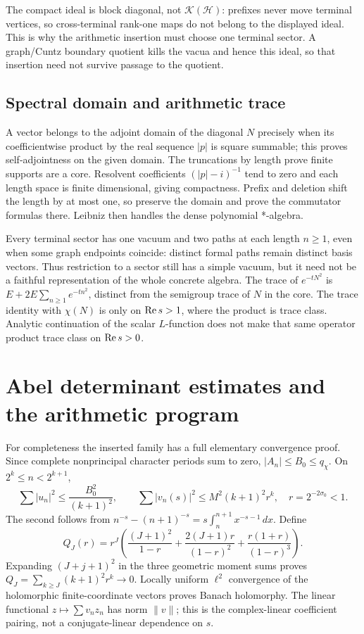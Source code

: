 The compact ideal is block diagonal, not $\mathcal K(\mathcal H)$: prefixes never move terminal vertices, so cross-terminal rank-one maps do not belong to the displayed ideal. This is why the arithmetic insertion must choose one terminal sector. A graph/Cuntz boundary quotient kills the vacua and hence this ideal, so that insertion need not survive passage to the quotient.

\section{Spectral domain and arithmetic trace}
A vector belongs to the adjoint domain of the diagonal $N$ precisely when its coefficientwise product by the real sequence $|p|$ is square summable; this proves self-adjointness on the given domain. The truncations by length prove finite supports are a core. Resolvent coefficients $(|p|-i)^{-1}$ tend to zero and each length space is finite dimensional, giving compactness. Prefix and deletion shift the length by at most one, so preserve the domain and prove the commutator formulas there. Leibniz then handles the dense polynomial *-algebra.

Every terminal sector has one vacuum and two paths at each length $n\ge1$, even when some graph endpoints coincide: distinct formal paths remain distinct basis vectors. Thus restriction to a sector still has a simple vacuum, but it need not be a faithful representation of the whole concrete algebra. The trace of $e^{-tN^2}$ is $E+2E\sum_{n\ge1}e^{-tn^2}$, distinct from the semigroup trace of $N$ in the core. The trace identity with $\chi(N)$ is only on $\operatorname{Re} s>1$, where the product is trace class. Analytic continuation of the scalar $L$-function does not make that same operator product trace class on $\operatorname{Re} s>0$.


\chapter{Abel determinant estimates and the arithmetic program}
For completeness the inserted family has a full elementary convergence proof. Since complete nonprincipal character periods sum to zero, $|A_n|\le B_0\le q_\chi$. On $2^k\le n<2^{k+1}$,
\[
 \sum |u_n|^2\le\frac{B_0^2}{(k+1)^2},\qquad
 \sum |v_n(s)|^2\le M^2(k+1)^2r^k,\quad r=2^{-2\sigma_0}<1.
\]
The second follows from $n^{-s}-(n+1)^{-s}=s\int_n^{n+1}x^{-s-1}\,dx$. Define
\[
 Q_J(r)=r^J\left(\frac{(J+1)^2}{1-r}
 +\frac{2(J+1)r}{(1-r)^2}+\frac{r(1+r)}{(1-r)^3}\right).
\]
Expanding $(J+j+1)^2$ in the three geometric moment sums proves $Q_J=\sum_{k\ge J}(k+1)^2r^k\to0$. Locally uniform $\ell^2$ convergence of the holomorphic finite-coordinate vectors proves Banach holomorphy. The linear functional $z\mapsto\sum v_nz_n$ has norm $\|v\|$; this is the complex-linear coefficient pairing, not a conjugate-linear dependence on $s$.

